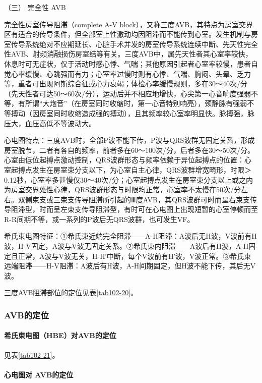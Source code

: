 \hypertarget{text00297.htmlux5cux23CHP10-2-10-2-2-3}{}
（三） 完全性 AVB

完全性房室传导阻滞（complete A-V
block），又称三度AVB，其特点为房室交界区有适合的传导条件，但全部室上性激动均因阻滞而不能传到心室。发生机制与房室传导系统绝对不应期延长、心脏手术并发的房室传导系统连续中断、先天性完全性AVB、射频消融损伤房室结等有关。三度AVB中，属先天性者其心室率较快，休息时可无症状，仅于活动时感心悸、气喘；其他原因引起者心室率较慢，患者自觉心率缓慢、心跳强而有力；心室率过慢时则有心悸、气喘、胸闷、头晕、乏力等，重者可出现阿斯综合征或心力衰竭；体检心率缓慢规则，多在30～40次/分（先天性者可达50～60次/分），运动后并不相应地增快，心尖第一心音响度强弱不等，有所谓“大炮音”（在房室同时收缩时，第一心音特别响亮），颈静脉有强弱不等搏动（因房室同时收缩造成强的搏动），且其频率较心室率明显快。脉搏强，脉压大，血压高低不等波动大。

心电图特点：三度AVB时，全部P波不能下传，P波与QRS波群无固定关系，形成房室脱节，二者有各自的频率，前者多在60～100次/分，后者多在30～50次/分。心室由低位起搏点激动控制，QRS波群形态与频率依赖于异位起搏点的位置：心室起搏点发生在房室束分支以下，为心室自主心律，QRS波群增宽畸形，时限＞
0.12秒，心室率多甚慢仅30～40次/分；心室起搏点发生在房室束分支以上或之内为房室交界处性心律，QRS波群形态与时限均正常，心室率不太慢在50次/分左右。双侧束支或三束支传导阻滞所引起的Ⅲ度AVB，其QRS波群可时而呈右束支传导阻滞型，时而呈左束支传导阻滞型，有时可在心电图上出现短暂的心室停顿而至R-R间期不等，或一系列的P波后无QRS波群，也可发生VF。

希氏束电图特征：①希氏束近端完全阻滞------A-H阻滞：A波后无H波，V波前有H波，H-V固定，A波与V波无固定关系。②希氏束内阻滞------A波后有H波，A-H固定且正常，A波与V波无关，H-H′中断，每个V波前有H′波，V波正常。③希氏束远端阻滞------H-V阻滞：A波后有H波，A-H间期固定，但H波不能下传，其后无V波。

三度AVB阻滞部位的定位见表\ref{tab102-20}。

\subsubsection{AVB的定位}

\paragraph{希氏束电图（HBE）对AVB的定位}

见表\ref{tab102-21}。

\paragraph{心电图对 AVB的定位}

